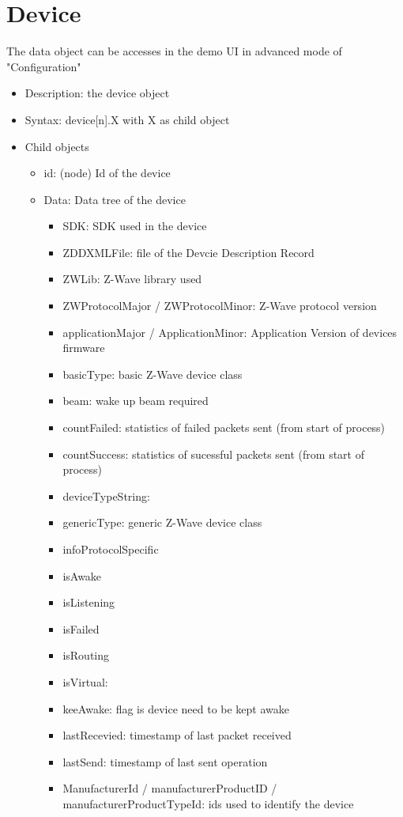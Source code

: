 \section{Device}

The data object can be accesses in the demo UI in advanced mode of "Configuration"

\begin {itemize}
\item Description: the device object
\item Syntax:  device[n].X with  X as child object
\item Child objects
\begin {itemize}
\item id: (node) Id of the device
\item Data: Data tree of the device
\begin {itemize}
\item SDK: SDK used in the device
\item ZDDXMLFile: file of the Devcie Description Record
\item ZWLib: Z-Wave library used
\item ZWProtocolMajor / ZWProtocolMinor: Z-Wave protocol version
\item applicationMajor / ApplicationMinor: Application Version of devices firmware
\item basicType: basic Z-Wave device class
\item beam: wake up beam required
\item countFailed: statistics of failed packets sent (from start of process)
\item countSuccess: statistics of sucessful packets sent (from start of process)
\item deviceTypeString:
\item genericType: generic Z-Wave device class
\item infoProtocolSpecific
\item isAwake
\item isListening
\item isFailed
\item isRouting
\item isVirtual: 
\item keeAwake: flag is device need to be kept awake
\item lastRecevied:  timestamp of last packet received
\item lastSend:  timestamp of last sent operation
\item ManufacturerId / manufacturerProductID / manufacturerProductTypeId: ids used to identify the device

\end{itemize}
\end{itemize}
\end{itemize}

